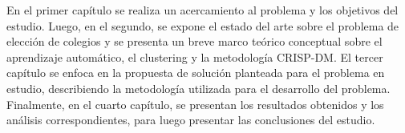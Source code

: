 En el primer capítulo se realiza un acercamiento al problema y los objetivos del estudio. Luego, en el segundo, se expone el estado del arte sobre el problema de elección de colegios y se presenta un breve marco teórico conceptual sobre el aprendizaje automático, el clustering y la metodología CRISP-DM. El tercer capítulo se enfoca en la propuesta de solución planteada para el problema en estudio, describiendo la metodología utilizada para el desarrollo del problema. Finalmente, en el cuarto capítulo, se presentan los resultados obtenidos y los análisis correspondientes, para luego presentar las conclusiones del estudio.